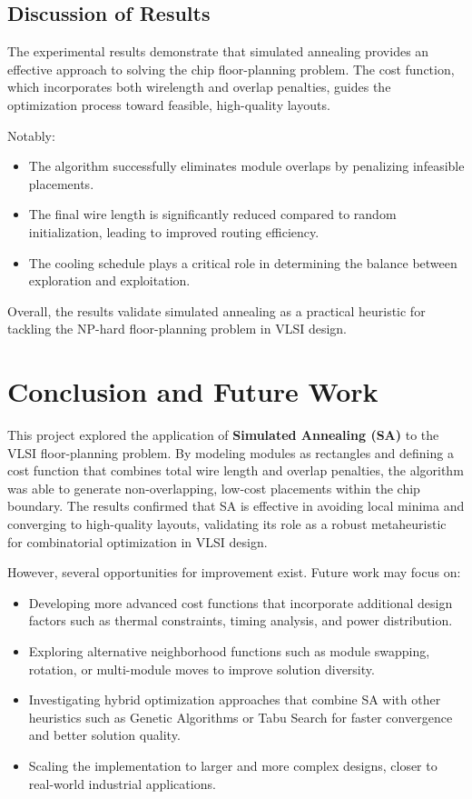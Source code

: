 \documentclass[9pt,a4paper,twoside]{rho-class/rho}
\begin{document}
\subsection{Discussion of Results}
The experimental results demonstrate that simulated annealing provides an effective approach to solving the chip floor-planning problem. The cost function, which incorporates both wirelength and overlap penalties, guides the optimization process toward feasible, high-quality layouts.  

Notably:
\begin{itemize}
    \item The algorithm successfully eliminates module overlaps by penalizing infeasible placements.
    \item The final wire length is significantly reduced compared to random initialization, leading to improved routing efficiency.
    \item The cooling schedule plays a critical role in determining the balance between exploration and exploitation.
\end{itemize}

Overall, the results validate simulated annealing as a practical heuristic for tackling the NP-hard floor-planning problem in VLSI design.

\section{Conclusion and Future Work}
This project explored the application of \textbf{Simulated Annealing (SA)} to the VLSI floor-planning problem. By modeling modules as rectangles and defining a cost function that combines total wire length and overlap penalties, the algorithm was able to generate non-overlapping, low-cost placements within the chip boundary. The results confirmed that SA is effective in avoiding local minima and converging to high-quality layouts, validating its role as a robust metaheuristic for combinatorial optimization in VLSI design.

However, several opportunities for improvement exist. Future work may focus on:
\begin{itemize}
    \item Developing more advanced cost functions that incorporate additional design factors such as thermal constraints, timing analysis, and power distribution.
    \item Exploring alternative neighborhood functions such as module swapping, rotation, or multi-module moves to improve solution diversity.
    \item Investigating hybrid optimization approaches that combine SA with other heuristics such as Genetic Algorithms or Tabu Search for faster convergence and better solution quality.
    \item Scaling the implementation to larger and more complex designs, closer to real-world industrial applications.
\end{itemize}
\end{document}
